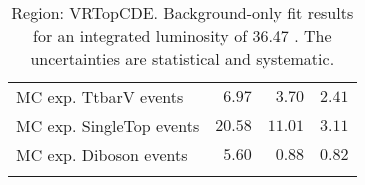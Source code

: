 \begin{table}
\begin{center}
{\begin{tabular*}{\textwidth}{@{\extracolsep{\fill}}lrrr}
        MC exp. TtbarV events         & $6.97$          & $3.70$          & $2.41$              \\
        MC exp. SingleTop events         & $20.58$          & $11.01$          & $3.11$              \\
        MC exp. Diboson events         & $5.60$          & $0.88$          & $0.82$              \\
\noalign{\smallskip}\hline\noalign{\smallskip}
\end{tabular*}
}
\end{center}
\caption{Region: VRTopCDE. Background-only fit results for an integrated luminosity of 36.47 \ifb. The uncertainties are statistical and systematic.
}
\label{table.bkgonly.VRTop}
\end{table}
%